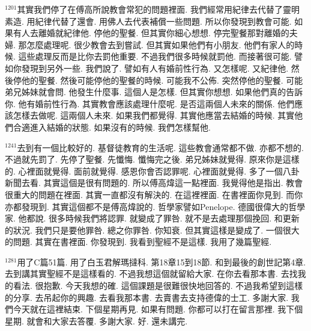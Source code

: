 \documentclass{book}
\begin{document}
$^{1201}$其實我們停了在傅高所說教會常犯的問題裡面.
我們經常用紀律去代替了靈明素造.
用紀律代替了還會.
用佛人去代表補償一些問題.
所以你發現到教會可能.
如果有人去離婚就紀律他.
停他的聖餐.
但其實你細心想想.
停完聖餐那對離婚的夫婦.
那怎麼處理呢.
很少教會去到嘗試.
但其實如果他們有小朋友.
他們有家人的時候.
這些處理反而是比你去罰他重要.
不過我們很多時候就罰他.
而接著很可能.
譬如你發現到另外一些.
我們說了.
譬如有人有婚前性行為.
又怎樣呢.
又紀律他.
然後停他的聖餐.
然後可能停他的聖餐的時候.
可能我不公佈.
突然停他的聖餐.
可能弟兄姊妹就會問.
他發生什麼事.
這個人是怎樣.
但其實你想想.
如果他們真的告訴你.
他有婚前性行為.
其實教會應該處理什麼呢.
是否這兩個人未來的關係.
他們應該怎樣去做呢.
這兩個人未來.
如果我們都覺得.
其實他應當去結婚的時候.
其實他們合適進入結婚的狀態.
如果沒有的時候.
我們怎樣幫他.

$^{1241}$去到有一個比較好的.
基督徒教育的生活呢.
這些教會通常都不做.
亦都不想的.
不過就先罰了.
先停了聖餐.
先懺悔.
懺悔完之後.
弟兄姊妹就覺得.
原來你是這樣的.
心裡面就覺得.
面前就覺得.
感恩你會否認罪呢.
心裡面就覺得.
多了一個八卦新聞去看.
其實這個是很有問題的.
所以傅高煒這一點裡面.
我覺得他是指出.
教會很重大的問題在裡面.
其實一直都沒有解決的.
在這裡裡面.
在書裡面你見到.
而你亦都發現到.
其實這個都不是傅高煒說的.
哲學家譬如Penelope.
德國很偉大的哲學家.
他都說.
很多時候我們將認罪.
就變成了罪咎.
就不是去處理那個挽回.
和更新的狀況.
我們只是要他罪咎.
總之你罪咎.
你知衰.
但其實這樣是變成了.
一個很大的問題.
其實在書裡面.
你發現到.
我看到聖經不是這樣.
我用了幾篇聖經.

$^{1281}$用了C篇51篇.
用了白玉君解瑪撻科.
第18章15到18節.
和到最後的創世記第4章.
去到講其實聖經不是這樣看的.
不過我想這個就留給大家.
在你去看那本書.
去找我的看法.
很抱歉.
今天我想的確.
這個課題是很難很快地回答的.
不過我希望到這樣的分享.
去吊起你的興趣.
去看我那本書.
去賣書去支持德偉的士工.
多謝大家.
我們今天就在這裡結束.
下個星期再見.
如果有問題.
你都可以打在留言那裡.
我下個星期.
就會和大家去答覆.
多謝大家.
好.
還未講完.
\newpage
\end{document}

